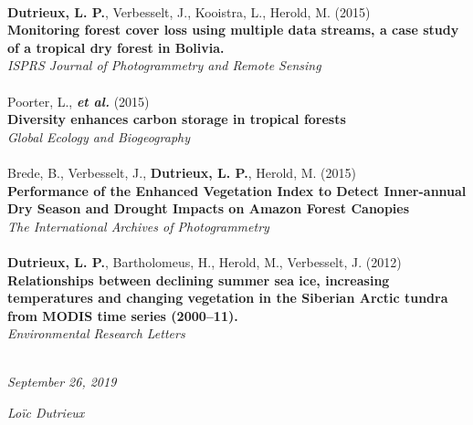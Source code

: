 \documentclass[]{friggeri-cv}
\begin{document}
    \\
    \textbf{Dutrieux, L. P.}, Verbesselt, J., Kooistra, L., Herold, M. (2015)\\
    \textbf{Monitoring forest cover loss using multiple data streams, a case study of a tropical dry forest in Bolivia.}\\
    \textit{ISPRS Journal of Photogrammetry and Remote Sensing}\\
    \\
    Poorter, L., \textbf{\textit{et al.}} (2015)\\
    \textbf{Diversity enhances carbon storage in tropical forests}\\
    \textit{Global Ecology and Biogeography}\\
    \\
    Brede, B., Verbesselt, J., \textbf{Dutrieux, L. P.}, Herold, M. (2015)\\
    \textbf{Performance of the Enhanced Vegetation Index to Detect Inner-annual Dry Season and Drought Impacts on Amazon Forest Canopies}\\
    \textit{The International Archives of Photogrammetry}\\
    \\
    \textbf{Dutrieux, L. P.}, Bartholomeus, H., Herold, M., Verbesselt, J. (2012)\\
    \textbf{Relationships between declining summer sea ice, increasing temperatures and changing vegetation in the Siberian Arctic tundra from MODIS time series (2000–11).}\\
    \textit{Environmental Research Letters}\\
    \\


\begin{flushleft}
\emph{September 26, 2019}
\end{flushleft}
\begin{flushright}
\emph{Lo\"{i}c Dutrieux}
\end{flushright}
\end{document}
